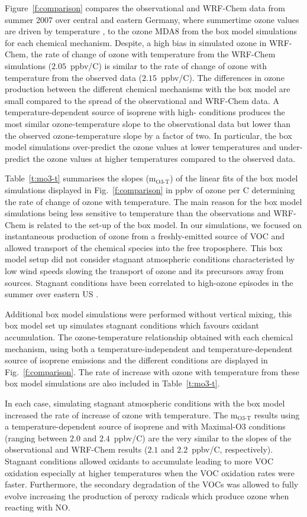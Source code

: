 Figure~\ref{f:comparison} compares the observational and WRF-Chem data from summer 2007 over central and eastern Germany, where summertime ozone values are driven by temperature \citep{Otero:2016}, to the ozone MDA8 from the box model simulations for each chemical mechanism.
Despite, a high bias in simulated ozone in WRF-Chem, the rate of change of ozone with temperature from the WRF-Chem simulations ($2.05$~ppbv/\degree C) is similar to the rate of change of ozone with temperature from the observed data ($2.15$~ppbv/\degree C).
The differences in ozone production between the different chemical mechanisms with the box model are small compared to the spread of the observational and WRF-Chem data.
A temperature-dependent source of isoprene with high- conditions produces the most similar ozone-temperature slope to the observational data but lower than the observed ozone-temperature slope by a factor of two.
In particular, the box model simulations over-predict the ozone values at lower temperatures and under-predict the ozone values at higher temperatures compared to the observed data.

Table~\ref{t:mo3-t} summarises the slopes (m$_{\text{O3-T}}$) of the linear fits of the box model simulations displayed in Fig.~\ref{f:comparison} in ppbv of ozone per \degree C determining the rate of change of ozone with temperature.
The main reason for the box model simulations being less sensitive to temperature than the observations and WRF-Chem is related to the set-up of the box model.
In our simulations, we focused on instantaneous production of ozone from a freshly-emitted source of VOC and allowed transport of the chemical species into the free troposphere.
This box model setup did not consider stagnant atmospheric conditions characteristed by low wind speeds slowing the transport of ozone and its precursors away from sources.
Stagnant conditions have been correlated to high-ozone episodes in the summer over eastern US \citep{Jacob:1993}.

Additional box model simulations were performed without vertical mixing, this box model set up simulates stagnant conditions which favours oxidant accumulation.
The ozone-temperature relationship obtained with each chemical mechanism, using both a temperature-independent and temperature-dependent source of isoprene emissions and the different  conditions are displayed in Fig.~\ref{f:comparison}.
The rate of increase with ozone with temperature from these box model simulations are also included in Table~\ref{t:mo3-t}.

In each case, simulating stagnant atmospheric conditions with the box model increased the rate of increase of ozone with temperature. 
The m$_{\text{O3-T}}$ results using a temperature-dependent source of isoprene and with Maximal-O3 conditions (ranging between $2.0$ and $2.4$~ppbv/\degree C) are the very similar to the slopes of the observational and WRF-Chem results ($2.1$ and $2.2$~ppbv/\degree C, respectively).
Stagnant conditions allowed oxidants to accumulate leading to more VOC oxidation especially at higher temperatures when the VOC oxidation rates were faster.
Furthermore, the secondary degradation of the VOCs was allowed to fully evolve increasing the production of peroxy radicals which produce ozone when reacting with NO.
